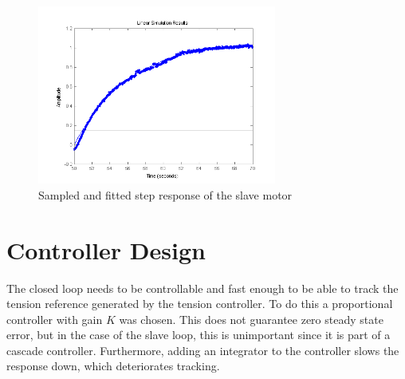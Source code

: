 \begin{figure}[htbp]
\centering
\includegraphics[width = 0.7\textwidth]{pics/RM_systemID.png}
\caption{Sampled and fitted step response of the slave motor}
\label{fig:RM_id}
\end{figure}

\FloatBarrier
\section{Controller Design}
The closed loop needs to be controllable and fast enough to be able to track the tension reference generated by the tension controller. To do this a proportional controller with gain $K$ was chosen. This does not guarantee zero steady state error, but in the case of the slave loop, this is unimportant since it is part of a cascade controller. Furthermore, adding an integrator to the controller slows the response down, which deteriorates tracking.

